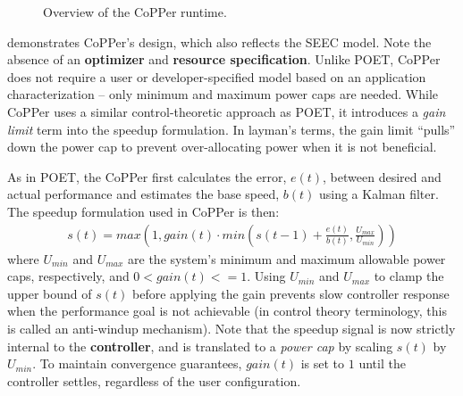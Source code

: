 \begin{figure}[t]
  \begin{centering}
    
    \caption{Overview of the CoPPer runtime.}
    \label{fig:copper-runtime}
  \end{centering}
\end{figure}

 demonstrates CoPPer's design, which also reflects the SEEC model.
Note the absence of an \textbf{optimizer} and \textbf{resource specification}.
Unlike POET, CoPPer does not require a user or developer-specified model based on an application characterization -- only minimum and maximum power caps are needed.
While CoPPer uses a similar control-theoretic approach as POET, it introduces a \emph{gain limit} term into the speedup formulation.
In layman's terms, the gain limit ``pulls'' down the power cap to prevent over-allocating power when it is not beneficial.

As in POET, the CoPPer first calculates the error, $e(t)$, between desired and actual performance and estimates the base speed, $b(t)$ using a Kalman filter.
The speedup formulation used in CoPPer is then:
\begin{eqnarray}
  s(t) = max\left(1, gain(t) \cdot min\left(s(t-1) + \frac{e(t)}{b(t)}, \frac{U_{max}}{U_{min}}\right)\right)
  \label{eqn:copper-speedup-control}
\end{eqnarray}
where $U_{min}$ and $U_{max}$ are the system's minimum and maximum allowable power caps, respectively, and $0 < gain(t) <= 1$.
Using $U_{min}$ and $U_{max}$ to clamp the upper bound of $s(t)$ before applying the gain prevents slow controller response when the performance goal is not achievable (in control theory terminology, this is called an anti-windup mechanism).
Note that the speedup signal is now strictly internal to the \textbf{controller}, and is translated to a \emph{power cap} by scaling $s(t)$ by $U_{min}$.
To maintain convergence guarantees, $gain(t)$ is set to $1$ until the controller settles, regardless of the user configuration.

